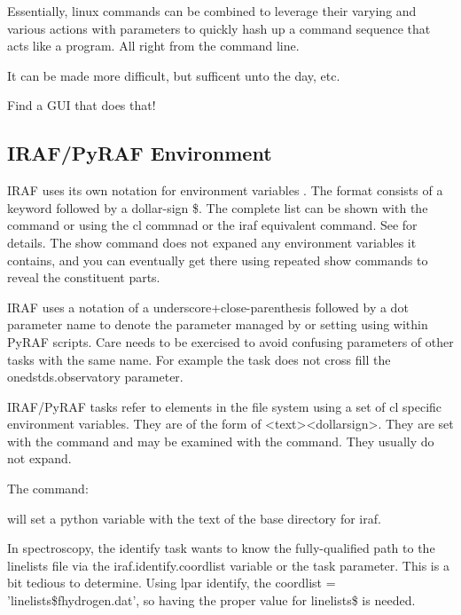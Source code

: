 Essentially, linux commands can be combined to leverage their varying
and various actions with parameters to quickly hash up a command sequence
that acts like a program. All right from the command line.

It can be made more difficult, but sufficent unto the day, etc.

Find a GUI that does that!


\subsection{IRAF/PyRAF Environment}  \label{sec:IRAFPyRAFEnvironment}

IRAF uses its own notation for environment variables .
The format consists of a keyword followed by a dollar-sign {\$}. The complete
list can be shown with the  command or using the cl commnad  or
the iraf equivalent  command. See  for details.
The show command does not expaned any environment variables it contains, and you
can eventually get there using repeated show commands to reveal the constituent parts.

IRAF uses a notation of a underscore+close-parenthesis followed by a dot
parameter name   to denote the parameter managed by
 or setting using 
within PyRAF scripts. Care needs to be exercised to avoid confusing 
parameters of other tasks with the same name. For example the task
 does not cross fill the onedstds.observatory parameter.
 



IRAF/PyRAF tasks refer to elements in the file system using a set of
cl specific environment variables. They are of the form of <text><dollarsign>.
They are set with the  command and may be examined with the 
command. They usually do not expand.

The command:


will set a python variable with the text of the base directory for iraf.

In spectroscopy, the identify task wants to know the fully-qualified
path to the linelists file via the iraf.identify.coordlist variable or
the  task parameter. This is a bit tedious to determine.
Using lpar identify, the coordlist = 'linelists\$fhydrogen.dat', so
having the proper value for linelists\$ is needed.

